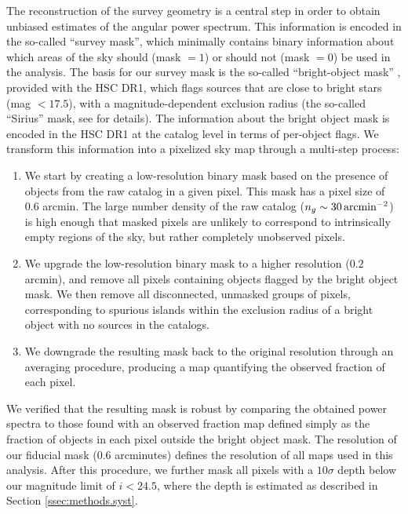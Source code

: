 \documentclass[a4paper,11pt]{article}
\begin{document}
    The reconstruction of the survey geometry is a central step in order to obtain unbiased estimates of the angular power spectrum. This information is encoded in the so-called ``survey mask'', which minimally contains binary information about which areas of the sky should (mask $=1$) or should not (mask $=0$) be used in the analysis. The basis for our survey mask is the so-called ``bright-object mask'' \cite{2018PASJ...70S...8A}, provided with the HSC DR1, which flags sources that are close to bright stars (mag $<17.5$), with a magnitude-dependent exclusion radius (the so-called ``Sirius'' mask, see \cite{2018PASJ...70S...8A} for details). The information about the bright object mask is encoded in the HSC DR1 at the catalog level in terms of per-object flags. We transform this information into a pixelized sky map through a multi-step process:
    \begin{enumerate}
      \item We start by creating a low-resolution binary mask based on the presence of objects from the raw catalog in a given pixel. This mask has a pixel size of 0.6 arcmin. The large number density of the raw catalog  ($n_g\sim30\,{\rm arcmin}^{-2}$) is high enough that masked pixels are unlikely to correspond to intrinsically empty regions of the sky, but rather completely unobserved pixels.
      \item We upgrade the low-resolution binary mask to a higher resolution ($0.2$ arcmin), and remove all pixels containing objects flagged by the bright object mask. We then remove all disconnected, unmasked groups of pixels, corresponding to spurious islands within the exclusion radius of a bright object with no sources in the catalogs.
      \item We downgrade the resulting mask back to the original resolution through an averaging procedure, producing a map quantifying the observed fraction of each pixel.
    \end{enumerate}
    We verified that the resulting mask is robust by comparing the obtained power spectra to those found with an observed fraction map defined simply as the fraction of objects in each pixel outside the bright object mask. The resolution of our fiducial mask ($0.6$ arcminutes) defines the resolution of all maps used in this analysis. After this procedure, we further mask all pixels with a $10\sigma$ depth below our magnitude limit of $i<24.5$, where the depth is estimated as described in Section \ref{ssec:methods.syst}.
\end{document}
